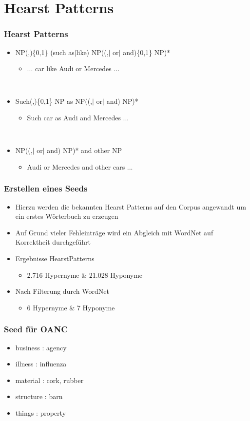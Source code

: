 \section{Hearst Patterns}
\label{sec:hearst-patterns}

\begin{frame}
  \frametitle{Hearst Patterns}

  \begin{itemize}
  \item NP(,)\{0,1\} (such as$\vert$like)
    NP((,$\vert$ or$\vert$ and)\{0,1\} NP)*
    \begin{itemize}
    \item ... car like Audi or Mercedes ...
    \end{itemize}~\\

  \item Such(,)\{0,1\} NP as NP((,$\vert$ or$\vert$ and) NP)*
    \begin{itemize}
    \item Such car as Audi and Mercedes ...
    \end{itemize}~\\

  \item NP((,$\vert$ or$\vert$ and) NP)* and  other NP
    \begin{itemize}
    \item Audi or Mercedes and other cars ...
    \end{itemize}

  \end{itemize}
\end{frame}

\begin{frame}
  \frametitle{Erstellen eines Seeds}
  
  \begin{itemize}
    \item Hierzu werden die bekannten Hearst Patterns auf den Corpus angewandt um ein erstes Wörterbuch zu erzeugen
    \item Auf Grund vieler Fehleinträge wird ein Abgleich mit WordNet auf Korrektheit durchgeführt
    \item Ergebnisse HearstPatterns
    \begin{itemize}
      \item 2.716 Hypernyme \& 21.028 Hyponyme
    \end{itemize}
    \item Nach Filterung durch WordNet
    \begin{itemize}
      \item 6 Hypernyme \& 7 Hyponyme
    \end{itemize}
  \end{itemize}
\end{frame}

\begin{frame}
  \frametitle{Seed für OANC}
  \begin{itemize}
    \item business  : agency
    \item illness   : influenza
    \item material  : cork, rubber
    \item structure : barn
    \item things    : property
  \end{itemize}
\end{frame}
